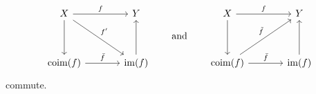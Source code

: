 \begin{lemma}
\begin{enumerate}
\begin{equation}
        \begin{tikzcd}[column sep = large, row sep = huge]
            X
            \arrow{r}[above]{f}
            \arrow{dr}[above right]{f'}
            \arrow{d}
          & Y
          \\
            \coim(f)
            \arrow{r}[above]{\bar{f}}
          & \im(f)
            \arrow{u}
        \end{tikzcd}
        \qquad\text{and}\qquad
        \begin{tikzcd}[column sep = large, row sep = huge]
            X
            \arrow{r}[above]{f}
            \arrow{d}
          & Y
          \\
            \coim(f)
            \arrow{r}[above]{\bar{f}}
            \arrow{ur}[above left]{\tilde{f}}
          & \im(f)
            \arrow{u}
        \end{tikzcd}
      \end{equation}
      commute.
  \end{enumerate}
\end{lemma}


